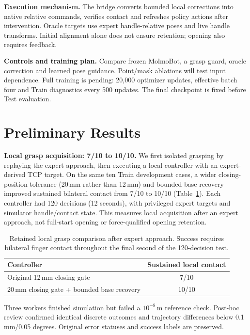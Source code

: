 \documentclass{article}
\begin{document}
\textbf{Execution mechanism.} The bridge converts bounded local corrections
into native relative commands, verifies contact and refreshes policy actions
after intervention. Oracle targets use expert handle-relative poses and live
handle transforms. Initial alignment alone does not ensure retention; opening
also requires feedback.

\textbf{Controls and training plan.} Compare frozen MolmoBot, a grasp guard,
oracle correction and learned pose guidance. Point/mask ablations will test
input dependence. Full training is pending: 20,000 optimizer updates, effective
batch four and Train diagnostics every 500 updates. The final checkpoint is
fixed before Test evaluation.

\section{Preliminary Results}
\label{sec:results}
\textbf{Local grasp acquisition: 7/10 to 10/10.} We first isolated grasping by
replaying the expert approach, then executing a local controller with an
expert-derived TCP target. On the same ten Train development cases, a wider
closing-position tolerance (20\,mm rather than 12\,mm) and bounded base recovery
improved sustained bilateral contact from 7/10 to 10/10 (Table~\ref{tab:contact}).
Each controller had 120 decisions (12 seconds), with privileged expert targets
and simulator handle/contact state. This measures local acquisition after an
expert approach, not full-start opening or force-qualified opening retention.

\begin{table}[!ht]
\centering
\caption{Retained local grasp comparison after expert approach. Success requires
bilateral finger contact throughout the final second of the 120-decision test.}
\label{tab:contact}
\begin{tabular}{lc}
\toprule
Controller & Sustained local contact\\
\midrule
Original 12\,mm closing gate & 7/10\\
20\,mm closing gate + bounded base recovery & 10/10\\
\bottomrule
\end{tabular}
\end{table}

Three workers finished simulation but failed a $10^{-8}$\,m reference check.
Post-hoc review confirmed identical discrete outcomes and trajectory differences
below 0.1\,mm/0.05 degrees. Original error statuses and success labels are preserved.
\end{document}
